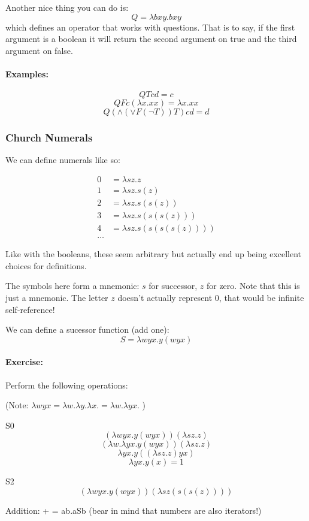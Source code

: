 \documentclass{article}
\begin{document}
Another nice thing you can do is:
\[ Q = \lambda bxy.bxy \]
which defines an operator that works with questions. That is to say,
if the first argument is a boolean it will return the second
argument on true and the third argument on false.

\paragraph{Examples:}
\[ QTcd = c \]
\[ QFc(\lambda x.xx) = \lambda x.xx \]
\[ Q(\land ( \lor F (\lnot T))T)cd = d \]

\subsubsection{Church Numerals}
We can define numerals like so:

\begin{align*}
	0 & = \lambda sz.z \\
	1 & = \lambda sz.s(z) \\
	2 & = \lambda sz.s(s(z)) \\
	3 & = \lambda sz.s(s(s(z))) \\
	4 & = \lambda sz.s(s(s(s(z)))) \\
	\ldots
\end{align*}
 
Like with the booleans, these seem arbitrary but actually end up
being excellent choices for definitions.

The symbols here form a mnemonic: $s$ for successor, $z$ for zero.
Note that this is just a mnemonic. The letter $z$ doesn't actually
represent 0, that would be infinite self-reference!

We can define a sucessor function (add one):
\[ S = \lambda wyx.y(wyx) \]


\paragraph{Exercise:}
Perform the following operations:

(Note:
\( \lambda wyx = \lambda w.\lambda y.\lambda x. = \lambda w.\lambda yx. \)
)

S0
\[ (\lambda wyx.y(wyx))(\lambda sz.z) \]
\[ (\lambda w.\lambda yx.y(wyx))(\lambda sz.z) \]
\[ \lambda yx.y((\lambda sz.z)yx) \]
\[ \lambda yx.y(x) = 1 \]

S2
\[ (\lambda wyx.y(wyx))(\lambda sz(s(s(z)))) \]

Addition:
+ = \lambda ab.aSb
(bear in mind that numbers are also iterators!)
\end{document}
